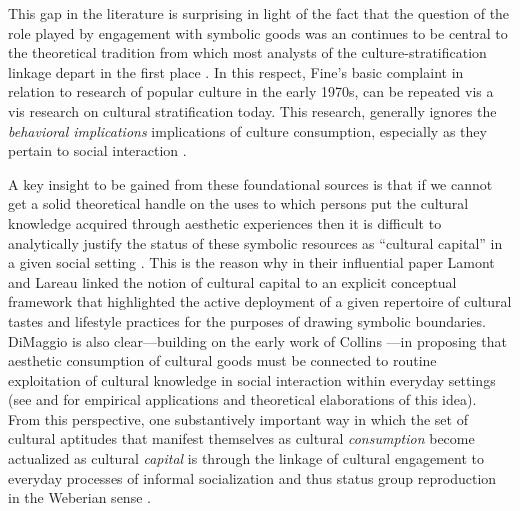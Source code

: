 \documentclass[11pt]{article}
\begin{document}
This gap in the literature is surprising in light of the fact that the question of the role played by engagement with symbolic goods was an continues to be central to the theoretical tradition from which most analysts of the culture-stratification linkage depart in the first place \citep{collins75, dimaggio87, douglas_isherwood96, fine77}.  In this respect, Fine's basic complaint in relation to research of popular culture in the early 1970s, can be repeated vis a vis research on cultural stratification today.  This research, generally ignores the \emph{behavioral implications} implications of culture consumption, especially as they pertain to social interaction \citep[453]{fine77}. 

A key insight to be gained from these foundational sources is that if we cannot get a solid theoretical handle on the uses to which persons put the cultural knowledge acquired through aesthetic experiences then it is difficult to analytically justify the status of these symbolic resources as ``cultural capital'' in a given social setting \citep{mohr_dimaggio95, dimaggio96, dimaggio00, carter03}.  This is the reason why in their influential paper Lamont and Lareau \citeyearpar{lamont_lareau88} linked the notion of cultural capital to an explicit conceptual framework that highlighted the active deployment of a given repertoire of cultural tastes and lifestyle practices for the purposes of drawing symbolic boundaries.  DiMaggio \citeyearpar{dimaggio87, dimaggio00} is also clear---building on the early work of Collins \citeyearpar{collins75}---in proposing that aesthetic consumption of cultural goods must be connected to routine exploitation of cultural knowledge in social interaction within everyday settings (see  \citet{erickson96} and \citet{lizardo06a} for empirical applications and theoretical elaborations of this idea).    From this perspective, one substantively important way in which the set of cultural aptitudes that manifest themselves as cultural \emph{consumption} become actualized as cultural \emph{capital} is through the linkage of cultural engagement to everyday processes of informal socialization and thus status group reproduction in the Weberian sense \citep{dimaggio_mohr85, dimaggio96}.
\end{document}
